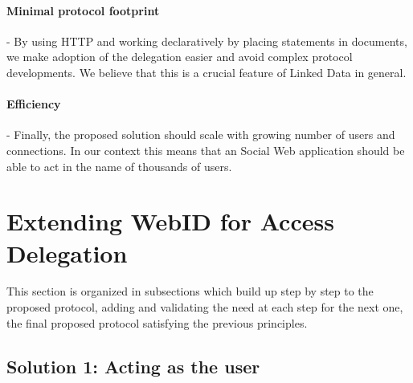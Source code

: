 \documentclass[a4paper]{llncs}
\begin{document}

\paragraph{Minimal protocol footprint}-
By using HTTP and working declaratively by placing statements in documents, we make adoption of the delegation easier and avoid complex protocol developments.
We believe that this is a crucial feature of Linked Data in general.

\paragraph{Efficiency}-
Finally, the proposed solution should scale with growing number of users and connections.
In our context this means that an Social Web application should be able to act in the name of thousands of users.

 

\section{Extending WebID for Access Delegation}\label{sec:spec}

This section is organized in subsections which build up step by step to the proposed protocol, adding and validating the need at each step for the next one, the final proposed protocol satisfying the previous principles. 

\subsection{Solution 1: Acting as the user}
\end{document}
